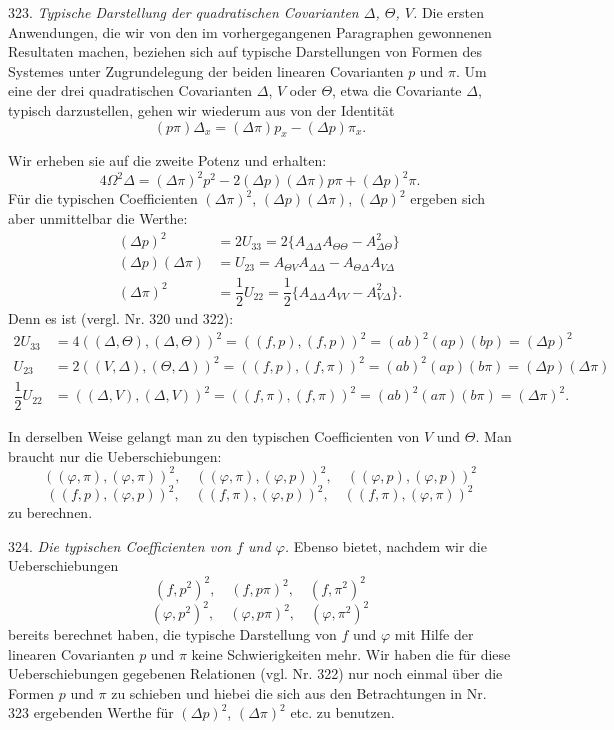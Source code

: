 323. \textit{Typische Darstellung der quadratischen Covarianten
$\Delta$, $\Theta$, $V$.} Die ersten Anwendungen, die wir von den im
vorhergegangenen Paragraphen gewonnenen Resultaten machen, beziehen
sich auf typische Darstellungen von Formen des Systemes unter
Zugrundelegung der beiden linearen Covarianten $p$ und $\pi$. Um eine
der drei quadratischen Covarianten $\Delta$, $V$ oder $\Theta$, etwa
die Covariante $\Delta$, typisch darzustellen, gehen wir wiederum aus
von der Identität
\[
(p\pi)\Delta_x=(\Delta\pi)p_x-(\Delta p)\pi_x.
\]



Wir erheben sie auf die zweite Potenz und erhalten:
\[
4\Omega^2\Delta=(\Delta\pi)^2p^2-2(\Delta p)(\Delta\pi)p\pi+(\Delta p)^2\pi.
\]
Für die typischen Coefficienten $(\Delta\pi)^2$, $(\Delta p)(\Delta\pi)$,
$(\Delta p)^2$ ergeben sich aber unmittelbar die Werthe:
\[
\begin{aligned}
(\Delta p)^2&=2U_{33}=2\{A_{\Delta\Delta}A_{\Theta\Theta}-A_{\Delta\Theta}^2\}\\
(\Delta p)(\Delta\pi)&=U_{23}=A_{\Theta V}A_{\Delta\Delta}-A_{\Theta\Delta}A_{V\Delta}\\
(\Delta\pi)^2&=\dfrac{1}{2}U_{22}=\dfrac{1}{2}\{A_{\Delta\Delta}A_{VV}-A_{V\Delta}^2\}.
\end{aligned}
\]
Denn es ist (vergl. Nr. 320 und 322):
\[
\begin{aligned}
2U_{33}&=4((\Delta,\Theta),(\Delta,\Theta))^2=((f,p),(f,p))^2=(ab)^2(ap)(bp)=(\Delta p)^2\\
U_{23}&=2((V,\Delta),(\Theta,\Delta))^2=((f,p),(f,\pi))^2=(ab)^2(ap)(b\pi)=(\Delta p)(\Delta\pi)\\
\dfrac{1}{2}U_{22}&=((\Delta,V),(\Delta,V))^2=((f,\pi),(f,\pi))^2=(ab)^2(a\pi)(b\pi)=(\Delta\pi)^2.
\end{aligned}
\]

In derselben Weise gelangt man zu den typischen Coefficienten von $V$
und $\Theta$. Man braucht nur die Ueberschiebungen:
\[
((\varphi,\pi),(\varphi,\pi))^2,\quad ((\varphi,\pi),(\varphi,p))^2,\quad ((\varphi,p),(\varphi,p))^2
\]
\[
((f,p),(\varphi,p))^2,\quad ((f,\pi),(\varphi,p))^2,\quad ((f,\pi),(\varphi,\pi))^2
\]
zu berechnen.

324. \textit{Die typischen Coefficienten von $f$ und $\varphi$.} Ebenso
bietet, nachdem wir die Ueberschiebungen
\[
(f,p^2)^2,\quad (f,p\pi)^2,\quad (f,\pi^2)^2
\]
\[
(\varphi,p^2)^2,\quad (\varphi,p\pi)^2,\quad (\varphi,\pi^2)^2
\]
bereits berechnet haben, die typische Darstellung von $f$ und $\varphi$
mit Hilfe der linearen Covarianten $p$ und $\pi$ keine Schwierigkeiten
mehr. Wir haben die für diese Ueberschiebungen gegebenen Relationen
(vgl. Nr. 322) nur noch einmal über die Formen $p$ und $\pi$ zu
schieben und hiebei die sich aus den Betrachtungen in Nr. 323
ergebenden Werthe für $(\Delta p)^2$, $(\Delta\pi)^2$ etc. zu benutzen.

